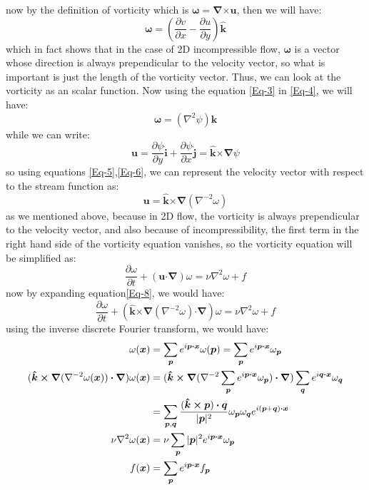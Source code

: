 \documentclass[12pt]{article}
\def\dotp{\bm{\cdot}}
\def\crossp{\bm{\times}}
\def\grad{\bm{\nabla}}
\def\lap{{\nabla}^2}
\def\lapinv{{\nabla}^{-2}}
\def\p{\bm{p}}
\def\q{\bm{q}}
\def\u{\bm{u}}
\def\x{\bm{x}}
\def\OMEGA{\bm{\omega}}
\def\eI{\bm{\hat{i}}}
\def\eJ{\bm{\hat{j}}}
\def\eK{\bm{\hat{k}}}
\begin{document}
%
now by the definition of vorticity which is $\OMEGA=\grad\crossp\u$, then we will have:
%
\begin{equation}\label{Eq-4}
\OMEGA=\left(\frac{\partial v}{\partial x}-\frac{\partial u}{\partial y}\right)\eK
\end{equation}
%
which in fact shows that in the case of 2D incompressible flow, $\OMEGA$ is a vector whose direction is always prependicular to the velocity vector, so what is important is just the length of the vorticity vector. Thus, we can look at the vorticity as an scalar function. Now using the equation \eqref{Eq-3} in \eqref{Eq-4}, we will have:
%
\begin{equation}\label{Eq-5}
\OMEGA=(\lap\psi)\eK
\end{equation}
%
while we can write:
%
\begin{equation}\label{Eq-6}
\u=\frac{\partial\psi}{\partial y}\eI+\frac{\partial\psi}{\partial x}\eJ=\eK\crossp\grad\psi
\end{equation}
so using equations \eqref{Eq-5},\eqref{Eq-6}, we can represent the velocity vector with respect to the stream function as:
%
\begin{equation}\label{Eq-7}
\u=\eK\crossp\grad(\lapinv\omega)
\end{equation}
%
as we mentioned above, because in 2D flow, the vorticity is always prependicular to the velocity vector, and also because of incompressibility, the first term in the right hand side of the vorticity equation vanishes, so the vorticity equation will be simplified as:
%
\begin{equation}\label{Eq-8}
\frac{\partial{\omega}}{\partial t} + (\u\dotp\grad)\omega= \nu\lap\omega + f
\end{equation}
%
now by expanding equation\eqref{Eq-8}, we would have:
%
\begin{equation}\label{Eq-9}
\frac{\partial{\omega}}{\partial t} + (\eK\crossp\grad(\lapinv\omega)\dotp\grad)\omega= \nu\lap\omega + f
\end{equation}
using the inverse discrete Fourier transform, we would have:
%
\begin{align}%
\omega(\x)&=\sum_{\p}{e^{i\p\dotp\x}\omega(\p)}=\sum_{\p}{e^{i\p\dotp\x}\omega_{\p}} 		  \notag 
\\
(\eK\crossp\grad(\lapinv\omega(\x))\dotp\grad)\omega(\x) &=(\eK\crossp\grad(\lapinv\sum_{\p}{e^{i\p\dotp\x}\omega_{\p}})\dotp\grad)\sum_{\q}{e^{i\q\dotp\x}\omega_{\q}} 								  \notag 
\\
&=\sum_{\p,\q}{\frac{(\eK\crossp\p)\dotp\q}{|\p|^2}\omega_{\p}\omega_{\q}e^{i(\p+\q)\dotp\x}} \notag 
\\
\nu\lap\omega(\x)&=\nu\sum_{\p}{|\p|^2e^{i\p\dotp\x}\omega_{\p}} 							  \notag 
\\
f(\x)&=\sum_{\p}{e^{i\p\dotp\x}f_{\p}} \label{Eq-10}
\end{align}
\end{document}
